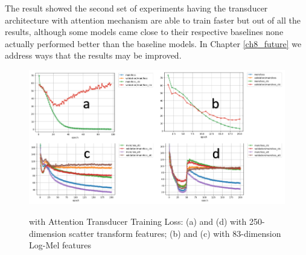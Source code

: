 The result showed the second set of experiments having the transducer architecture with attention mechanism are able to train faster but out of all the results, although some models came close to their respective baselines none actually performed better than the baseline models.  In Chapter \ref{ch8_future} we address ways that the results may be improved.

\stopblue

\begin{figure}
\centering
  \includegraphics[width=14cm]{thesis/images/scatter_res.PNG}\\
  \caption{ with Attention Transducer Training Loss: (a) and (d) with 250-dimension scatter transform features; (b) and (c) with 83-dimension Log-Mel features} \label{fig_6_2_loss}
\end{figure}

